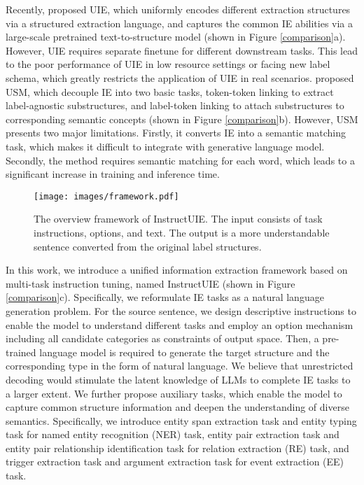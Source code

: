 \documentclass[11pt]{article}
\begin{document}
Recently, \citet{UIE} proposed UIE, which uniformly encodes different extraction structures via a structured extraction language, and captures the common IE abilities via a large-scale pretrained text-to-structure model (shown in Figure \ref{comparison}a). However, UIE requires separate finetune for different downstream tasks. This lead to the poor performance of UIE in low resource settings or facing new label schema, which greatly restricts the application of UIE in real scenarios. 
\citet{USM} proposed USM, which decouple IE into two basic tasks, token-token linking to extract label-agnostic substructures, and label-token linking to attach substructures to corresponding semantic concepts (shown in Figure \ref{comparison}b). However, USM presents two major limitations. Firstly, it converts IE into a semantic matching task, which makes it difficult to integrate with generative language model. Secondly, the method requires semantic matching for each word, which leads to a significant increase in training and inference time.


\begin{figure*}[t]
\centering
  \texttt{[image: images/framework.pdf]}
  \caption{The overview framework of InstructUIE. The input consists of task instructions, options, and text. The output is a more understandable sentence converted from the original label structures.}
 \label{fig:framework}
\end{figure*}


In this work, we introduce a unified information extraction framework based on multi-task instruction tuning, named InstructUIE (shown in Figure \ref{comparison}c). Specifically, we reformulate IE tasks as a natural language generation problem. 
For the source sentence, we design descriptive instructions to enable the model to understand different tasks and employ an option mechanism including all candidate categories as constraints of output space. 
Then, a pre-trained language model is required to generate the target structure and the corresponding type in the form of natural language. 
We believe that unrestricted decoding would stimulate the latent knowledge of LLMs to complete IE tasks to a larger extent. 
We further propose auxiliary tasks, which enable the model to capture common structure information and deepen the understanding of diverse semantics. 
Specifically, we introduce entity span extraction task and entity typing task for named entity recognition (NER) task, entity pair extraction task and entity pair relationship identification task for relation extraction (RE) task, and trigger extraction task and argument extraction task for event extraction (EE) task. 
\end{document}
